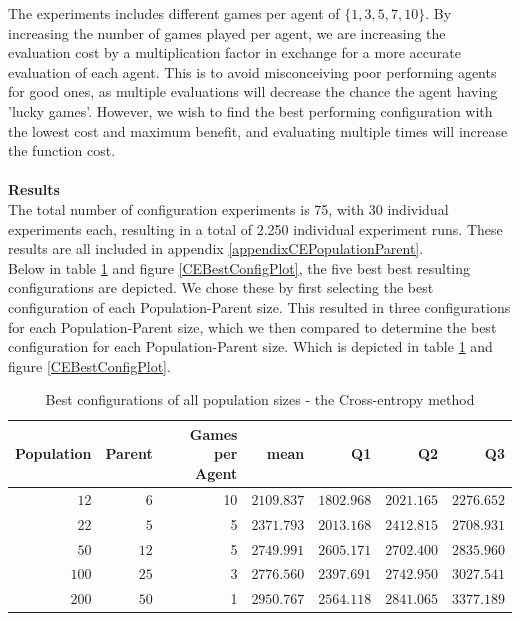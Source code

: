 The experiments includes different games per agent of $\{1,3,5,7,10\}$. By increasing the number of games 
played per agent, we are increasing the evaluation cost by a multiplication factor in exchange for a more 
accurate evaluation of each agent. This is to avoid misconceiving poor performing agents
for good ones, as multiple evaluations will decrease the chance the agent having 
'lucky games'. However, we wish to find 
the best performing configuration with the lowest cost and maximum benefit, and evaluating multiple 
times will increase the function cost.\\
\\
\textbf{Results}\\
The total number of configuration experiments is 75, with 30 individual experiments each,
resulting in a total of 2.250 individual experiment runs. These results are all included in 
appendix \ref{appendixCEPopulationParent}.\\
Below in table \ref{CEBestConfigTable} and figure \ref{CEBestConfigPlot}, the five best
best resulting configurations are depicted. We chose these by first selecting the best 
configuration of each Population-Parent size. This resulted in three
configurations for each Population-Parent size, which we then compared to determine the best
configuration for each Population-Parent size. Which is depicted in table \ref{CEBestConfigTable} and figure \ref{CEBestConfigPlot}.
\begin{table}[H]
\centering
\small
\begin{tabular}{r r r r r r r}
Population & Parent & Games per Agent & mean & Q1 & Q2 & Q3\\
\hline
$12$ & $6$ & 10 & $2109.837$ & $1802.968$ & $2021.165$ & $2276.652$\\
$22$ & $5$ & 5 & $2371.793$ & $2013.168$ & $2412.815$ & $2708.931$\\
$50$ & $12$ & 5 & $2749.991$ & $2605.171$ & $2702.400$ & $2835.960$\\
$100$ & $25$ & 3 & $2776.560$ & $2397.691$ & $2742.950$ & $3027.541$\\
$200$ & $50$ & 1 & $2950.767$ & $2564.118$ & $2841.065$ & $3377.189$\\
\end{tabular}
\caption{Best configurations of all population sizes - the Cross-entropy method \label{CEBestConfigTable}}
\end{table}


